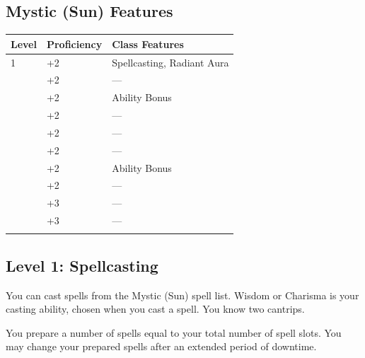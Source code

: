 \documentclass[12pt,letterpaper,twocolumn,openany,nodeprecatedcode,bg=none]{dndbook}
\let\oldsubsection\subsection
\renewcommand{\subsection}[1]{%
  \needspace{5\baselineskip}%
  \oldsubsection{#1}%
}
\begin{document}
\subsection{Mystic (Sun) Features}\label{mystic-sun-features}


{\def\LTcaptype{none} %
\begin{table}[!htbp]
\centering
\begin{tabular}{@{}
  >{\raggedright\arraybackslash}p{}
  >{\raggedright\arraybackslash}p{}
  >{\raggedright\arraybackslash}p{}@{}}
\toprule\noalign{}
\begin{minipage}[b]{\linewidth}\raggedright
Level
\end{minipage} & \begin{minipage}[b]{\linewidth}\raggedright
Proficiency
\end{minipage} & \begin{minipage}[b]{\linewidth}\raggedright
Class Features
\end{minipage} \\
\midrule\noalign{}
1 & +2 & Spellcasting, Radiant Aura \\
2 & +2 & --- \\
3 & +2 & Ability Bonus \\
4 & +2 & --- \\
5 & +2 & --- \\
6 & +2 & --- \\
7 & +2 & Ability Bonus \\
8 & +2 & --- \\
9 & +3 & --- \\
10 & +3 & --- \\
\bottomrule\noalign{}
\end{tabular}
\end{table}
}

\subsection{Level 1: Spellcasting}\label{level-1-spellcasting}

You can cast spells from the Mystic (Sun) spell list. Wisdom or Charisma
is your casting ability, chosen when you cast a spell. You know two
cantrips.

You prepare a number of spells equal to your total number of spell
slots. You may change your prepared spells after an extended period of
downtime.
\end{document}

